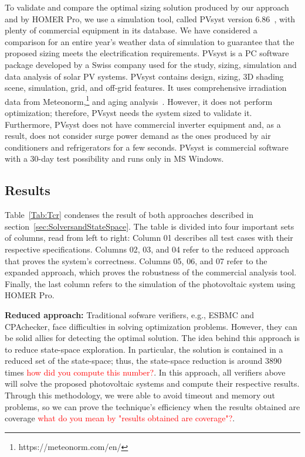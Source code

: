 \documentclass[10pt,journal,compsoc]{IEEEtran}
\begin{document}
To validate and compare the optimal sizing solution produced by our approach and by HOMER Pro, we use a simulation tool, called PVsyst version $6.86$~\cite{PVsyst}, with plenty of commercial equipment in its database. We have considered a comparison for an entire year's weather data of simulation to guarantee that the proposed sizing meets the electrification requirements. PVsyst is a PC software package developed by a Swiss company used for the study, sizing, simulation and data analysis of solar PV systems. PVsyst contains design, sizing, 3D shading scene, simulation, grid, and off-grid features. It uses comprehensive irradiation data from Meteonorm,\footnote{https://meteonorm.com/en/} and aging analysis~\cite{PVsyst2017}. However, it does not perform optimization; therefore, PVsyst needs the system sized to validate it. Furthermore, PVsyst does not have commercial inverter equipment and, as a result, does not consider surge power demand as the ones produced by air conditioners and refrigerators for a few seconds. PVsyst is commercial software with a $30$-day test possibility and runs only in MS Windows.

\subsection{Results}

 Table~\ref{Tab:Tcr} condenses the result of both approaches described in section~\ref{sec:SolversandStateSpace}. The table is divided into four important sets of columns, read from left to right: Column 01 describes all test cases with their respective specifications. Columns 02, 03, and 04 refer to the reduced approach that proves the system's correctness. Columns 05, 06, and 07 refer to the expanded approach, which proves the robustness of the commercial analysis tool. Finally, the last column refers to the simulation of the photovoltaic system using HOMER Pro.

\textbf{Reduced approach:} Traditional sofware verifiers, e.g., ESBMC and CPAchecker, face difficulties in solving optimization problems. However, they can be solid allies for detecting the optimal solution. The idea behind this approach is to reduce state-space exploration. In particular, the solution is contained in a reduced set of the state-space; thus, the state-space reduction is around 3890 times \textcolor{red}{how did you compute this number?}. In this approach, all verifiers above will solve the proposed photovoltaic systems and compute their respective results. Through this methodology, we were able to avoid timeout and memory out problems, so we can prove the technique's efficiency when the results obtained are coverage \textcolor{red}{what do you mean by "results obtained are coverage"?}.
\end{document}
